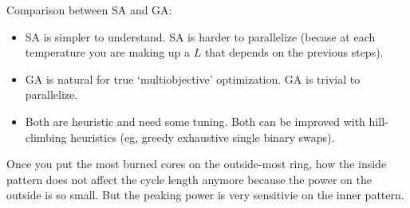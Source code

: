 \documentclass{school-22.211-notes}
\begin{document}
\clearpage
{}
Comparison between SA and GA:
\begin{itemize}
\item SA is simpler to understand. SA is harder to parallelize (becase at each temperature you are making up a $L$ that depends on the previous steps). 
\item GA is natural for true `multiobjective' optimization. GA is trivial to parallelize. 
\item Both are heuristic and need some tuning. Both can be improved with hill-climbing heuristics (eg, greedy exhaustive single binary swaps). 
\end{itemize}
Once you put the most burned cores on the outside-most ring, how the inside pattern does not affect the cycle length anymore because the power on the outside is so small. But the peaking power is very sensitivie on the inner pattern. 
\end{document}
